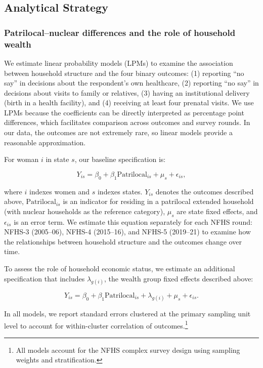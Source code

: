 \documentclass[12pt]{article}
\begin{document}
\subsection{Analytical Strategy}
\subsubsection{Patrilocal–nuclear differences and the role of household wealth}

We estimate linear probability models (LPMs) to examine the association between household structure and the four binary outcomes: (1) reporting ``no say'' in decisions about the respondent's own healthcare, (2) reporting ``no say'' in decisions about visits to family or relatives, (3) having an institutional delivery (birth in a health facility), and (4) receiving at least four prenatal visits. We use LPMs because the coefficients can be directly interpreted as percentage point differences, which facilitates comparison across outcomes and survey rounds. In our data, the outcomes are not extremely rare, so linear models provide a reasonable approximation.

For woman $i$ in state $s$, our baseline specification is:

\begin{equation} \label{eq:nocontrols}
Y_{is} = \beta_0 + \beta_1 \text{Patrilocal}_{is} + \mu_s + \epsilon_{is},
\end{equation}

where $i$ indexes women and $s$ indexes states. $Y_{is}$ denotes the outcomes described above, $\text{Patrilocal}_{is}$ is an indicator for residing in a patrilocal extended household (with nuclear households as the reference category), $\mu_s$ are state fixed effects, and $\epsilon_{is}$ is an error term. We estimate this equation separately for each NFHS round: NFHS-3 (2005--06), NFHS-4 (2015--16), and NFHS-5 (2019--21) to examine how the relationships between household structure and the outcomes change over time.

To assess the role of household economic status, we estimate an additional specification that includes $\lambda_{g(i)}$, the wealth group fixed effects described above:

\begin{equation} \label{eq:controls}
Y_{is} = \beta_0 + \beta_1 \text{Patrilocal}_{is} + \lambda_ {g(i)} + \mu_s + \epsilon_{is}.
\end{equation}

In all models, we report standard errors clustered at the primary sampling unit level to account for within-cluster correlation of outcomes.\footnote{All models account for the NFHS complex survey design using sampling weights and stratification.}
\end{document}
